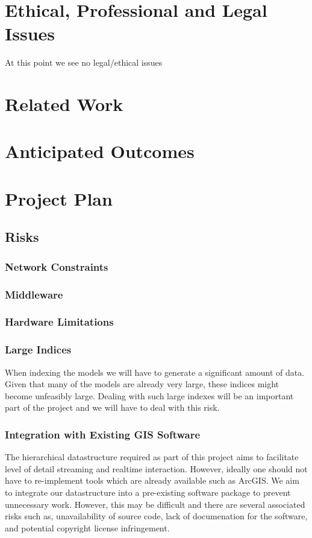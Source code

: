 \documentclass[12pt,a4paper]{article}
\begin{document}
\section{Ethical, Professional and Legal Issues}
At this point we see no legal/ethical issues
\section{Related Work}
\section{Anticipated Outcomes}
\section{Project Plan}
\subsection{Risks}
\subsubsection*{Network Constraints}
\subsubsection*{Middleware}
\subsubsection*{Hardware Limitations}
\subsubsection*{Large Indices}
When indexing the models we will have to generate a significant amount of data. Given that many of the models are already very large, these indices might become unfeasibly large. Dealing with such large indexes will be an important part of the project and we will have to deal with this risk.
\subsubsection*{Integration with Existing GIS Software}
The hierarchical datastructure required as part of this project aims to facilitate level of detail streaming and realtime interaction. However, ideally one should not have to re-implement tools which are already available such as ArcGIS. We aim to integrate our datastructure into a pre-existing software package to prevent unnecessary work. However, this may be difficult and there are several associated risks such as, unavailability of source code, lack of documenation for the software, and potential copyright license infringement.
\end{document}

